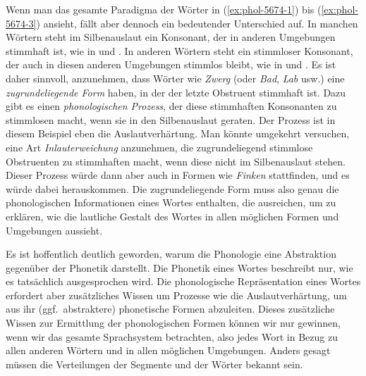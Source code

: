 Wenn man das gesamte Paradigma der Wörter in (\ref{ex:phol-5674-1}) bis (\ref{ex:phol-5674-3}) ansieht, fällt aber dennoch ein bedeutender Unterschied auf.
In manchen Wörtern steht im Silbenauslaut ein Konsonant, der in anderen Umgebungen stimmhaft ist, wie in \textipa{[\t{ts}v\t{E@}k]} und \textipa{[\t{ts}v\t{E@}g@s]}.
In anderen Wörtern steht ein stimmloser Konsonant, der auch in diesen anderen Umgebungen stimmlos bleibt, wie in \textipa{[fINk]} und \textipa{[fINk@n]}.
Es ist daher sinnvoll, anzunehmen, dass Wörter wie \textit{Zwerg} (oder \textit{Bad}, \textit{Lab} usw.) eine \textit{zugrundeliegende Form} haben, in der der letzte Obstruent stimmhaft ist.
Dazu gibt es einen \textit{phonologischen Prozess}, der diese stimmhaften Konsonanten zu stimmlosen macht, wenn sie in den Silbenauslaut geraten.%
Der Prozess ist in diesem Beispiel eben die Auslautverhärtung.
Man könnte umgekehrt versuchen, eine Art \textit{Inlauterweichung} anzunehmen, die zugrundeliegend stimmlose Obstruenten zu stimmhaften macht, wenn diese nicht im Silbenauslaut stehen.
Dieser Prozess würde dann aber auch in Formen wie \textit{Finken} stattfinden, und es würde\Ast\textipa{[fIN@n]} dabei herauskommen.
Die zugrundeliegende Form muss also genau die phonologischen Informationen eines Wortes enthalten, die ausreichen, um zu erklären, wie die lautliche Gestalt des Wortes in allen möglichen Formen und Umgebungen aussieht.


Es ist hoffentlich deutlich geworden, warum die Phonologie eine Abstraktion gegenüber der Phonetik darstellt.
Die Phonetik eines Wortes beschreibt nur, wie es tatsächlich ausgesprochen wird.
Die phonologische Repräsentation eines Wortes erfordert aber zusätzliches Wissen um Prozesse wie die Auslautverhärtung, um aus ihr (ggf.\ abstraktere) phonetische Formen abzuleiten.
Dieses zusätzliche Wissen zur Ermittlung der phonologischen Formen können wir nur gewinnen, wenn wir das gesamte Sprachsystem betrachten, also jedes Wort in Bezug zu allen anderen Wörtern und in allen möglichen Umgebungen.
Anders gesagt müssen die Verteilungen der Segmente und der Wörter bekannt sein.

